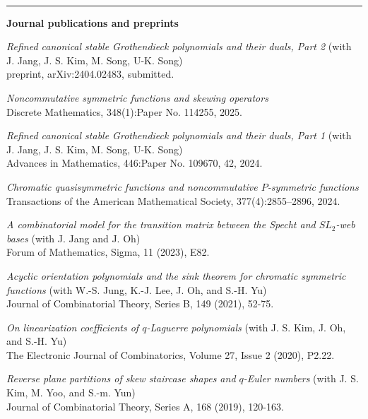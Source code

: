 \documentclass[letterpaper,11pt]{article}
\newcommand{\resheading}[1]{
	\vspace{5pt}
	\textbf{\sffamily{\mbox{~}\makebox[6.762in][l]{\large #1} \vphantom{p\^{E}}}} \\[-6pt]
	\par\noindent\rule{\textwidth}{0.4pt}
}
\begin{document}
\vspace{1cm}
\resheading{Publications}
{\bf Journal publications and preprints}
\begin{etaremune}
    \item \emph{Refined canonical stable Grothendieck polynomials and their duals, Part 2} (with J. Jang, J. S. Kim, M. Song, U-K. Song) \\
    preprint, arXiv:2404.02483, submitted.

    \item \emph{Noncommutative symmetric functions and skewing operators} \\
    Discrete Mathematics, 348(1):Paper No. 114255, 2025.

    \item \emph{Refined canonical stable Grothendieck polynomials and their duals, Part 1} (with J. Jang, J. S. Kim, M. Song, U-K. Song) \\
    Advances in Mathematics, 446:Paper No. 109670, 42, 2024.
    
    \item \emph{Chromatic quasisymmetric functions and noncommutative $P$-symmetric functions} \\
    Transactions of the American Mathematical Society, 377(4):2855–2896, 2024.

    \item \emph{A combinatorial model for the transition matrix between the Specht and $SL_2$-web bases} (with J. Jang and J. Oh) \\
    Forum of Mathematics, Sigma, 11 (2023), E82.
    
    \item \emph{Acyclic orientation polynomials and the sink theorem for chromatic symmetric functions} (with W.-S. Jung, K.-J. Lee, J. Oh, and S.-H. Yu) \\
    Journal of Combinatorial Theory, Series B, 149 (2021), 52-75.

    \item \emph{On linearization coefficients of $q$-Laguerre polynomials} (with J. S. Kim, J. Oh, and S.-H. Yu) \\
    The Electronic Journal of Combinatorics, Volume 27, Issue 2 (2020), P2.22.

    \item \emph{Reverse plane partitions of skew staircase shapes and $q$-Euler numbers} (with J. S. Kim, M. Yoo, and S.-m. Yun) \\
    Journal of Combinatorial Theory, Series A, 168 (2019), 120-163.
\end{etaremune}
	
\end{document}
